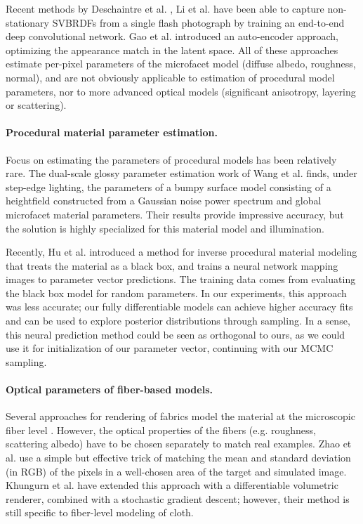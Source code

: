 Recent methods by Deschaintre et al. \cite{deschaintre2018single}, Li et al. \cite{li2018materials} have been able to capture non-stationary SVBRDFs from a single flash photograph by training an end-to-end deep convolutional network. Gao et al. \cite{gao2019deep} introduced an auto-encoder approach, optimizing the appearance match in the latent space. All of these approaches estimate per-pixel parameters of the microfacet model (diffuse albedo, roughness, normal), and are not obviously applicable to estimation of procedural model parameters, nor to more advanced optical models (significant anisotropy, layering or scattering).

\paragraph{Procedural material parameter estimation.} Focus on estimating the parameters of procedural models has been relatively rare. The dual-scale glossy parameter estimation work of Wang et al. \cite{wang2011estimating} finds, under step-edge lighting, the parameters of a bumpy surface model consisting of a heightfield constructed from a Gaussian noise power spectrum and global microfacet material parameters. Their results provide impressive accuracy, but the solution is highly specialized for this material model and illumination.

Recently, Hu et al. \cite{hu2019novel} introduced a method for inverse procedural material modeling that treats the material as a black box, and trains a neural network mapping images to parameter vector predictions. The training data comes from evaluating the black box model for random parameters. In our experiments, this approach was less accurate; our fully differentiable models can achieve higher accuracy fits and can be used to explore posterior distributions through sampling. In a sense, this neural prediction method could be seen as orthogonal to ours, as we could use it for initialization of our parameter vector, continuing with our MCMC sampling.

\paragraph{Optical parameters of fiber-based models.} Several approaches for rendering of fabrics model the material at the microscopic fiber level \cite{zhao2011building,zhao2016fitting,leaf2018interactive}. However, the optical properties of the fibers (e.g. roughness, scattering albedo) have to be chosen separately to match real examples. Zhao et al. \cite{zhao2011building} use a simple but effective trick of matching the mean and standard deviation (in RGB) of the pixels in a well-chosen area of the target and simulated image. Khungurn et al. \cite{khungurn2015matching} have extended this approach with a differentiable volumetric renderer, combined with a stochastic gradient descent; however, their method is still specific to fiber-level modeling of cloth.

